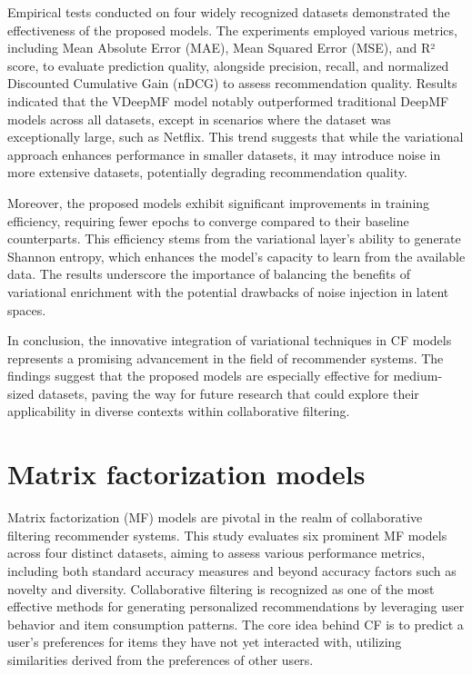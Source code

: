 \documentclass[runningheads]{llncs}
\begin{document}
Empirical tests conducted on four widely recognized datasets demonstrated the effectiveness of the proposed models. The experiments employed various metrics, including Mean Absolute Error (MAE), Mean Squared Error (MSE), and R² score, to evaluate prediction quality, alongside precision, recall, and normalized Discounted Cumulative Gain (nDCG) to assess recommendation quality. Results indicated that the VDeepMF model notably outperformed traditional DeepMF models across all datasets, except in scenarios where the dataset was exceptionally large, such as Netflix. This trend suggests that while the variational approach enhances performance in smaller datasets, it may introduce noise in more extensive datasets, potentially degrading recommendation quality.

Moreover, the proposed models exhibit significant improvements in training efficiency, requiring fewer epochs to converge compared to their baseline counterparts. This efficiency stems from the variational layer's ability to generate Shannon entropy, which enhances the model's capacity to learn from the available data. The results underscore the importance of balancing the benefits of variational enrichment with the potential drawbacks of noise injection in latent spaces.

In conclusion, the innovative integration of variational techniques in CF models represents a promising advancement in the field of recommender systems. The findings suggest that the proposed models are especially effective for medium-sized datasets, paving the way for future research that could explore their applicability in diverse contexts within collaborative filtering.
\section{Matrix factorization models}
Matrix factorization (MF) models are pivotal in the realm of collaborative filtering recommender systems. This study evaluates six prominent MF models across four distinct datasets, aiming to assess various performance metrics, including both standard accuracy measures and beyond accuracy factors such as novelty and diversity. Collaborative filtering is recognized as one of the most effective methods for generating personalized recommendations by leveraging user behavior and item consumption patterns. The core idea behind CF is to predict a user's preferences for items they have not yet interacted with, utilizing similarities derived from the preferences of other users. 
\end{document}
